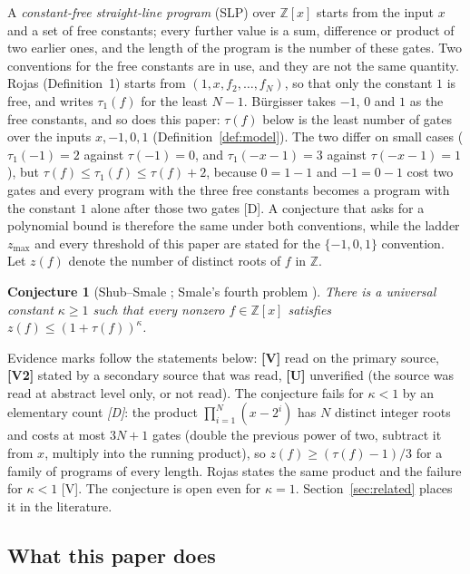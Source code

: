 \documentclass[11pt]{article}
\newtheorem{conjecture}[theorem]{Conjecture}
\theoremstyle{definition}
\theoremstyle{remark}
\newcommand{\Z}{\mathbb{Z}}
\newcommand{\zmax}{z_{\max}}
\begin{document}
A \emph{constant-free straight-line program} (SLP) over $\Z[x]$ starts from the input $x$ and a
set of free constants; every further value is a sum, difference or product of two earlier ones, and
the length of the program is the number of these gates. Two conventions for the free constants
are in use, and they are not the same quantity. Rojas \cite{Rojas2003} (Definition~1) starts from
$(1, x, f_2, \dots, f_N)$, so that only the constant $1$ is free, and writes $\tau_1(f)$ for the
least $N - 1$. B\"urgisser \cite{Burgisser2024} takes $-1$, $0$ and $1$ as the free constants, and
so does this paper: $\tau(f)$ below is the least number of gates over the inputs $x, -1, 0, 1$
(Definition~\ref{def:model}). The two differ on small cases ($\tau_1(-1) = 2$ against $\tau(-1) = 0$, and
$\tau_1(-x-1) = 3$ against $\tau(-x-1) = 1$), but $\tau(f) \le \tau_1(f) \le \tau(f) + 2$, because
$0 = 1 - 1$ and $-1 = 0 - 1$ cost two gates and every program with the three free constants
becomes a program with the constant $1$ alone after those two gates [D]. A conjecture that
asks for a polynomial bound is therefore the same under both conventions, while the ladder $\zmax$
and every threshold of this paper are stated for the $\{-1, 0, 1\}$ convention. Let $z(f)$
denote the number of distinct roots of $f$ in $\Z$.

\begin{conjecture}[Shub--Smale \cite{ShubSmale1995}; Smale's fourth problem \cite{Smale1998}]
There is a universal constant $\kappa \ge 1$ such that every nonzero
$f \in \Z[x]$ satisfies $z(f) \le (1 + \tau(f))^{\kappa}$.
\end{conjecture}

Evidence marks follow the statements below: \textbf{[V]} read on the primary source,
\textbf{[V2]} stated by a secondary source that was read, \textbf{[U]} unverified (the source
was read at abstract level only, or not read). The conjecture fails for $\kappa < 1$ by an
elementary count \emph{[D]}: the product $\prod_{i=1}^{N}(x - 2^i)$ has $N$ distinct integer
roots and costs at most $3N + 1$ gates (double the previous power of two, subtract it from
$x$, multiply into the running product), so $z(f) \ge (\tau(f) - 1)/3$ for a family of
programs of every length. Rojas states the same product and the failure for $\kappa < 1$
\cite{Rojas2003} [V]. The conjecture is open even for $\kappa = 1$. Section~\ref{sec:related}
places it in the literature.

\subsection{What this paper does}
\end{document}
